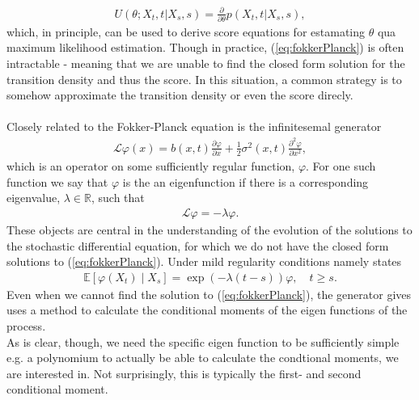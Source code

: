 \begin{align}
    U(\theta; X_t, t | X_s, s) = \frac{\partial}{\partial\theta}p(X_t, t | X_s, s), \label{eq:transitionScore}
\end{align}
which, in principle, can be used to derive score equations for estamating $\theta$ qua maximum likelihood estimation. Though in practice, (\ref{eq:fokkerPlanck}) is often intractable - meaning that we are unable to find the closed form solution for the transition density and thus the score. In this situation, a common strategy is to somehow approximate the transition density or even the score direcly. \\\\
Closely related to the Fokker-Planck equation is the infinitesemal generator 
\begin{align}
    \mathcal{L}\varphi(x) = b(x, t) \frac{\partial\varphi}{\partial x} + \frac{1}{2}\sigma^2(x, t)\frac{\partial^2\varphi}{\partial x^2} \label{eq:infinitesemalGeneratorDefinition},
\end{align}
which is an operator on some sufficiently regular function, $\varphi$. For one such function we say that $\varphi$ is the an eigenfunction if there is a corresponding eigenvalue, $\lambda\in\mathbb{R}$, such that
\begin{align}
    \mathcal{L}\varphi = -\lambda\varphi.
\end{align} 
These objects are central in the understanding of the evolution of the solutions to the stochastic differential equation, for which we do not have the closed form solutions to (\ref{eq:fokkerPlanck}). Under mild regularity conditions \cite[theorem 1.16]{StatisticalMethodsForSDE} namely states
\begin{align}
    \mathbb{E}\left[\varphi(X_{t}) \middle | X_{s}\right] = \exp\left(-\lambda \left(t - s\right)\right)\varphi \label{eq:momentConditions}, \quad t\geq s.
\end{align}
Even when we cannot find the solution to (\ref{eq:fokkerPlanck}), the generator gives uses a method to calculate the conditional moments of the eigen functions of the process.\\
As is clear, though, we need the specific eigen function to be sufficiently simple e.g. a polynomium to actually be able to calculate the condtional moments, we are interested in. Not surprisingly, this is typically the first- and second conditional moment.
